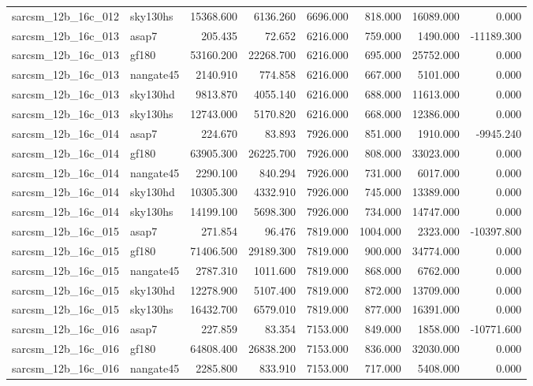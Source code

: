 \begin{tabular}{llrrrrrr}
sarcsm\_12b\_16c\_012 & sky130hs & 15368.600 & 6136.260 & 6696.000 & 818.000 & 16089.000 & 0.000 \\
sarcsm\_12b\_16c\_013 & asap7 & 205.435 & 72.652 & 6216.000 & 759.000 & 1490.000 & -11189.300 \\
sarcsm\_12b\_16c\_013 & gf180 & 53160.200 & 22268.700 & 6216.000 & 695.000 & 25752.000 & 0.000 \\
sarcsm\_12b\_16c\_013 & nangate45 & 2140.910 & 774.858 & 6216.000 & 667.000 & 5101.000 & 0.000 \\
sarcsm\_12b\_16c\_013 & sky130hd & 9813.870 & 4055.140 & 6216.000 & 688.000 & 11613.000 & 0.000 \\
sarcsm\_12b\_16c\_013 & sky130hs & 12743.000 & 5170.820 & 6216.000 & 668.000 & 12386.000 & 0.000 \\
sarcsm\_12b\_16c\_014 & asap7 & 224.670 & 83.893 & 7926.000 & 851.000 & 1910.000 & -9945.240 \\
sarcsm\_12b\_16c\_014 & gf180 & 63905.300 & 26225.700 & 7926.000 & 808.000 & 33023.000 & 0.000 \\
sarcsm\_12b\_16c\_014 & nangate45 & 2290.100 & 840.294 & 7926.000 & 731.000 & 6017.000 & 0.000 \\
sarcsm\_12b\_16c\_014 & sky130hd & 10305.300 & 4332.910 & 7926.000 & 745.000 & 13389.000 & 0.000 \\
sarcsm\_12b\_16c\_014 & sky130hs & 14199.100 & 5698.300 & 7926.000 & 734.000 & 14747.000 & 0.000 \\
sarcsm\_12b\_16c\_015 & asap7 & 271.854 & 96.476 & 7819.000 & 1004.000 & 2323.000 & -10397.800 \\
sarcsm\_12b\_16c\_015 & gf180 & 71406.500 & 29189.300 & 7819.000 & 900.000 & 34774.000 & 0.000 \\
sarcsm\_12b\_16c\_015 & nangate45 & 2787.310 & 1011.600 & 7819.000 & 868.000 & 6762.000 & 0.000 \\
sarcsm\_12b\_16c\_015 & sky130hd & 12278.900 & 5107.400 & 7819.000 & 872.000 & 13709.000 & 0.000 \\
sarcsm\_12b\_16c\_015 & sky130hs & 16432.700 & 6579.010 & 7819.000 & 877.000 & 16391.000 & 0.000 \\
sarcsm\_12b\_16c\_016 & asap7 & 227.859 & 83.354 & 7153.000 & 849.000 & 1858.000 & -10771.600 \\
sarcsm\_12b\_16c\_016 & gf180 & 64808.400 & 26838.200 & 7153.000 & 836.000 & 32030.000 & 0.000 \\
sarcsm\_12b\_16c\_016 & nangate45 & 2285.800 & 833.910 & 7153.000 & 717.000 & 5408.000 & 0.000 \\

\end{tabular}

